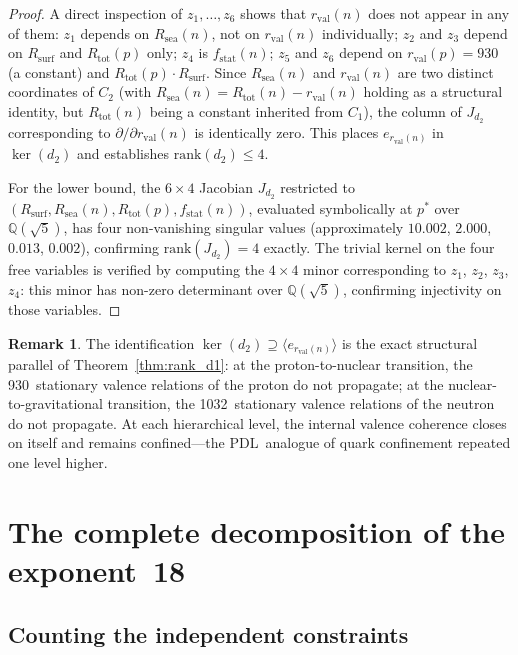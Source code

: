 \documentclass[11pt,a4paper]{article}
\theoremstyle{definition}
\newtheorem{remark}[theorem]{Remark}
\newcommand{\PDL}{\textnormal{PDL}}
\newcommand{\Rsurf}{R_{\mathrm{surf}}}
\newcommand{\Rsea}{R_{\mathrm{sea}}}
\newcommand{\Rtot}{R_{\mathrm{tot}}}
\newcommand{\rval}{r_{\mathrm{val}}}
\newcommand{\rank}{\mathrm{rank}}
\newcommand{\dmap}[1]{d_{#1}}
\begin{document}
\begin{proof}
A direct inspection of $z_1, \ldots, z_6$ shows that $\rval(n)$ does not appear in any of them: $z_1$ depends on $\Rsea(n)$, not on $\rval(n)$ individually; $z_2$ and $z_3$ depend on $\Rsurf$ and $\Rtot(p)$ only; $z_4$ is $f_{\mathrm{stat}}(n)$; $z_5$ and $z_6$ depend on $\rval(p) = 930$ (a constant) and $\Rtot(p) \cdot \Rsurf$. Since $\Rsea(n)$ and $\rval(n)$ are two distinct coordinates of $C_2$ (with $\Rsea(n) = \Rtot(n) - \rval(n)$ holding as a structural identity, but $\Rtot(n)$ being a constant inherited from $C_1$), the column of $J_{\dmap{2}}$ corresponding to $\partial/\partial\rval(n)$ is identically zero. This places $e_{\rval(n)}$ in $\ker(\dmap{2})$ and establishes $\rank(\dmap{2}) \leq 4$.

For the lower bound, the $6 \times 4$ Jacobian $J_{\dmap{2}}$ restricted to $(\Rsurf, \Rsea(n), \Rtot(p), f_{\mathrm{stat}}(n))$, evaluated symbolically at $p^*$ over $\mathbb{Q}(\sqrt{5})$, has four non-vanishing singular values (approximately $10.002$, $2.000$, $0.013$, $0.002$), confirming $\rank(J_{\dmap{2}}) = 4$ exactly. The trivial kernel on the four free variables is verified by computing the $4 \times 4$ minor corresponding to $z_1$, $z_2$, $z_3$, $z_4$: this minor has non-zero determinant over $\mathbb{Q}(\sqrt{5})$, confirming injectivity on those variables.
\end{proof}

\begin{remark}
  \label{rem:neutron_confinement}
  The identification $\ker(\dmap{2}) \supseteq \langle e_{\rval(n)}\rangle$ is the exact structural parallel of Theorem~\ref{thm:rank_d1}: at the proton-to-nuclear transition, the 930~stationary valence relations of the proton do not propagate; at the nuclear-to-gravitational transition, the 1032~stationary valence relations of the neutron do not propagate. At each hierarchical level, the internal valence coherence closes on itself and remains confined---the \PDL\ analogue of quark confinement repeated one level higher.
\end{remark}

\section{The complete decomposition of the exponent~18}
\label{sec:decomp}

\subsection{Counting the independent constraints}
\label{subsec:counting}
\end{document}

